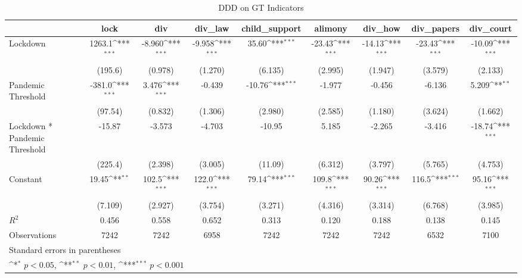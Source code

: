 \documentclass{article}
\begin{document}
{
\def\sym#1{\ifmmode^{#1}\else\(^{#1}\)\fi}
\begin{longtable}{l*{8}{c}}
\caption{DDD on GT Indicators}\\
\hline\hline\endfirsthead\hline\endhead\hline\endfoot\endlastfoot
                &\multicolumn{1}{c}{lock}&\multicolumn{1}{c}{div}&\multicolumn{1}{c}{div\_law}&\multicolumn{1}{c}{child\_support}&\multicolumn{1}{c}{alimony}&\multicolumn{1}{c}{div\_how}&\multicolumn{1}{c}{div\_papers}&\multicolumn{1}{c}{div\_court}\\
\hline
Lockdown        &   1263.1\sym{***}&   -8.960\sym{***}&   -9.958\sym{***}&    35.60\sym{***}&   -23.43\sym{***}&   -14.13\sym{***}&   -23.43\sym{***}&   -10.09\sym{***}\\
                &  (195.6)         &  (0.978)         &  (1.270)         &  (6.135)         &  (2.995)         &  (1.947)         &  (3.579)         &  (2.133)         \\
Pandemic Threshold&   -381.0\sym{***}&    3.476\sym{***}&   -0.439         &   -10.76\sym{***}&   -1.977         &   -0.456         &   -6.136         &    5.209\sym{**} \\
                &  (97.54)         &  (0.832)         &  (1.306)         &  (2.980)         &  (2.585)         &  (1.180)         &  (3.624)         &  (1.662)         \\
Lockdown * Pandemic Threshold&   -15.87         &   -3.573         &   -4.703         &   -10.95         &    5.185         &   -2.265         &   -3.416         &   -18.74\sym{***}\\
                &  (225.4)         &  (2.398)         &  (3.005)         &  (11.09)         &  (6.312)         &  (3.797)         &  (5.765)         &  (4.753)         \\
Constant        &    19.45\sym{**} &    102.5\sym{***}&    122.0\sym{***}&    79.14\sym{***}&    109.8\sym{***}&    90.26\sym{***}&    116.5\sym{***}&    95.16\sym{***}\\
                &  (7.109)         &  (2.927)         &  (3.754)         &  (3.271)         &  (4.316)         &  (3.314)         &  (6.768)         &  (3.985)         \\
\hline
\(R^{2}\)       &    0.456         &    0.558         &    0.652         &    0.313         &    0.120         &    0.188         &    0.138         &    0.145         \\
Observations    &     7242         &     7242         &     6958         &     7242         &     7242         &     7242         &     6532         &     7100         \\
\hline\hline
\multicolumn{9}{l}{\footnotesize Standard errors in parentheses}\\
\multicolumn{9}{l}{\footnotesize \sym{*} \(p<0.05\), \sym{**} \(p<0.01\), \sym{***} \(p<0.001\)}\\
\end{longtable}
}
\end{document}
